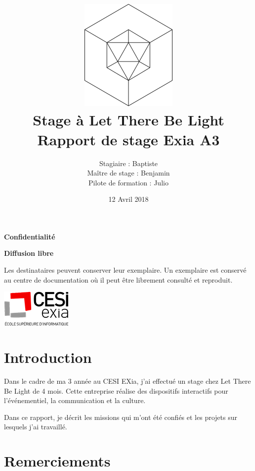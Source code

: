 \documentclass{article}
\title{\includegraphics{img/logo.png}\vspace{2cm}\\
Stage à Let There Be Light \\
\large Rapport de stage Exia A3}
\date{12 Avril 2018}
\author{Stagiaire : Baptiste \bsc{Saclier} \\
Maître de stage : Benjamin \bsc{Petit}\\
Pilote de formation : Julio \bsc{Santilario}}
\begin{document}
    \maketitle

    \vspace{2cm}

    \hspace{\fill}
    \begin{minipage}{10cm}
        \begin{center}
            \textbf{\large Confidentialité}\par
            \textbf{Diffusion libre}
        \end{center}
        Les  destinataires  peuvent  conserver  leur  exemplaire.
        Un  exemplaire  est  conservé  au centre de documentation où il peut être librement consulté et reproduit.
    \end{minipage}
    \hspace{\fill}

    \vspace{\fill}

    \hspace{\fill}\includegraphics{img/exia.png}

    \clearpage

    \tableofcontents

    \section{Introduction}

    Dans le cadre de ma 3 année au CESI EXia, j'ai effectué un stage chez Let There Be Light de 4 mois.
    Cette entreprise réalise des dispositifs interactifs pour l'événementiel, la communication et la culture.

    Dans ce rapport, je décrit les missions qui m'ont été confiés et les projets sur lesquels j'ai travaillé.

    \clearpage

    \section{Remerciements}

    \vspace{\fill}
\end{document}

